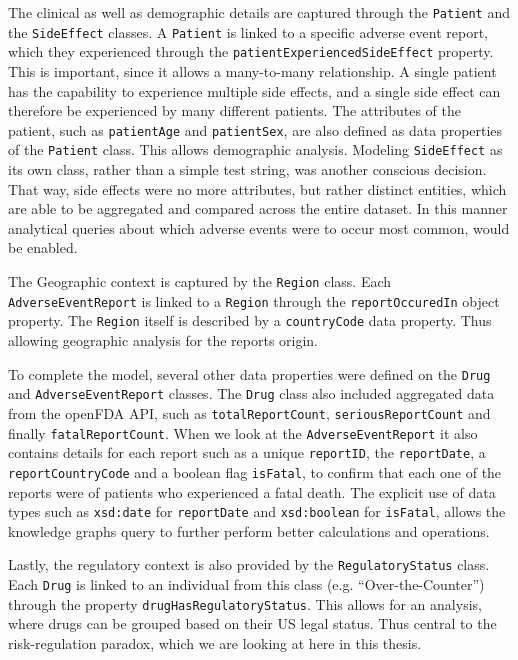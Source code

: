 The clinical as well as demographic details are captured through the \texttt{Patient} and the \texttt{Side\-Effect} classes. A \texttt{Patient} is linked to a specific adverse event report, which they experienced through the \texttt{patient\-Experienced\-Side\-Effect} property. This is important, since it allows a many-to-many relationship. A single patient has the capability to experience multiple side effects, and a single side effect can therefore be experienced by many different patients. The attributes of the patient, such as \texttt{patient\-Age} and \texttt{patient\-Sex}, are also defined as data properties of the \texttt{Patient} class. This allows demographic analysis. Modeling \texttt{Side\-Effect} as its own class, rather than a simple test string, was another conscious decision. That way, side effects were no more attributes, but rather distinct entities, which are able to be aggregated and compared across the entire dataset. In this manner analytical queries about which adverse events were to occur most common, would be enabled.

The Geographic context is captured by the \texttt{Region} class. Each \texttt{Adverse\-Event\-Report} is linked to a \texttt{Region} through the \texttt{report\-Occured\-In} object property. The \texttt{Region} itself is described by a \texttt{country\-Code} data property. Thus allowing geographic analysis for the reports origin.

To complete the model, several other data properties were defined on the \texttt{Drug} and \texttt{Adverse\-Event\-Report} classes. The \texttt{Drug} class also included aggregated data from the openFDA API, such as \texttt{total\-Report\-Count}, \texttt{serious\-Report\-Count} and finally \texttt{fatal\-Report\-Count}. When we look at the \texttt{Adverse\-Event\-Report} it also contains details for each report such as a unique \texttt{report\-ID}, the \texttt{report\-Date}, a \texttt{report\-Country\-Code} and a boolean flag \texttt{is\-Fatal}, to confirm that each one of the reports were of patients who experienced a fatal death. The explicit use of data types such as \texttt{xsd:date} for \texttt{report\-Date} and \texttt{xsd:boolean} for \texttt{is\-Fatal}, allows the knowledge graphs query to further perform better calculations and operations.

Lastly, the regulatory context is also provided by the \texttt{Regulatory\-Status} class. Each \texttt{Drug} is linked to an individual from this class (e.g. “Over-the-Counter”) through the property \texttt{drug\-Has\-Regulatory\-Status}. This allows for an analysis, where drugs can be grouped based on their US legal status. Thus central to the risk-regulation paradox, which we are looking at here in this thesis.

